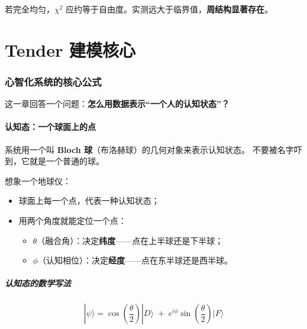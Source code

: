 \documentclass[UTF8,a4paper,11pt]{ctexart}
\newcommand{\term}[1]{\textbf{#1}}
\newcommand{\hl}[1]{\textcolor{blue!70!black}{\textbf{#1}}}
\begin{document}
若完全均匀，$\chi^2$ 应约等于自由度。实测远大于临界值，\hl{周结构显著存在}。

\newpage


\part{Tender 建模核心}

\section{心智化系统的核心公式}

这一章回答一个问题：\hl{怎么用数据表示“一个人的认知状态”？}

\subsection{认知态：一个球面上的点}

系统用一个叫 \term{Bloch 球}（布洛赫球）的几何对象来表示认知状态。
不要被名字吓到，它就是一个普通的球。

想象一个地球仪：

\begin{itemize}[leftmargin=1.6em]
\item 球面上每一个点，代表一种认知状态；
\item 用两个角度就能定位一个点：
  \begin{itemize}
  \item $\theta$（融合角）：决定\hl{纬度}——点在上半球还是下半球；
  \item $\phi$（认知相位）：决定\hl{经度}——点在东半球还是西半球。
  \end{itemize}
\end{itemize}

\subsubsection{认知态的数学写法}

\begin{equation}
|\psi\rangle = \cos\!\left(\frac{\theta}{2}\right)|D\rangle
\;+\; e^{i\phi}\sin\!\left(\frac{\theta}{2}\right)|F\rangle
\end{equation}
\end{document}
